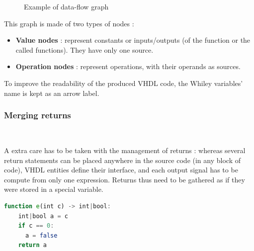 \documentclass[10pt,a4paper]{article}
\renewcommand{\indent}{~\\\vspace{-.8cm}}
\begin{document}
\begin{figure}[h]
	\centering
	\qquad
	\caption{Example of data-flow graph}
\end{figure}


This graph is made of two types of nodes : 
\begin{itemize}
	\item \textbf{Value nodes} : represent constants or inputs/outputs (of the function or the called functions). They have only one source.
	\item \textbf{Operation nodes} : represent operations, with their operands as sources.
\end{itemize}


To improve the readability of the produced VHDL code, the Whiley variables' name is kept as an arrow label. 


\subsubsection{Merging returns}
\indent

A extra care has to be taken with the management of returns : whereas several return statements can be placed anywhere in the source code (in any block of code), VHDL entities define their interface, and each output signal has to be compute from only one expression.
Returns thus need to be gathered as if they were stored in a special variable.



\newbox\caseA
\begin{lrbox}{\caseA}
	\begin{minipage}[t]{.45\textwidth}
	\begin{lstlisting}[language=Octave, numbers=right]
function e(int c) -> int|bool:
    int|bool a = c
    if c == 0:
      a = false
    return a
	\end{lstlisting}
\end{minipage}
\end{lrbox}
\end{document}
